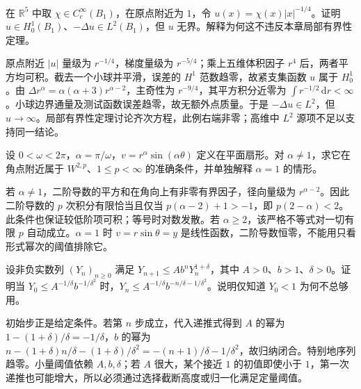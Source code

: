 \begin{exercise}\label{b2:ex:16-l2-unbounded}
在 \(\mathbb R^5\) 中取 \(\chi\in C_c^\infty(B_1)\)，在原点附近为 \(1\)，令 \(u(x)=\chi(x)|x|^{-1/4}\)。证明 \(u\in H_0^1(B_1)\)、\(-\Delta u\in L^2(B_1)\)，但 \(u\) 无界。解释为何这不违反本章局部有界性定理。
\end{exercise}
\begin{solution}
原点附近 \(|u|\) 量级为 \(r^{-1/4}\)，梯度量级为 \(r^{-5/4}\)；乘上五维体积因子 \(r^4\) 后，两者平方均可积。截去一个小球并平滑，误差的 \(H^1\) 范数趋零，故紧支集函数 \(u\) 属于 \(H_0^1\)。由 \(\Delta r^\alpha=\alpha(\alpha+3)r^{\alpha-2}\)，主奇性为 \(r^{-9/4}\)，其平方积分近零为 \(\int r^{-1/2}\,\mathrm dr<\infty\)。小球边界通量及测试函数误差趋零，故无额外点质量。于是 \(-\Delta u\in L^2\)，但 \(u\to\infty\)。局部有界性定理讨论齐次方程，此例右端非零；高维中 \(L^2\) 源项不足以支持同一结论。
\end{solution}

\begin{exercise}\label{b2:ex:16-corner-threshold}
设 \(0<\omega<2\pi\)，\(\alpha=\pi/\omega\)，\(v=r^\alpha\sin(\alpha\theta)\) 定义在平面扇形。对 \(\alpha\ne1\)，求它在角点附近属于 \(W^{2,p}\)、\(1\le p<\infty\) 的准确条件，并单独解释 \(\alpha=1\) 的情形。
\end{exercise}
\begin{solution}
若 \(\alpha\ne1\)，二阶导数的平方和在角向上有非零有界因子，径向量级为 \(r^{\alpha-2}\)。因此二阶导数的 \(p\) 次积分有限恰当且仅当 \(p(\alpha-2)+1>-1\)，即 \(p(2-\alpha)<2\)。此条件也保证较低阶项可积；等号时对数发散。若 \(\alpha\ge2\)，该严格不等式对一切有限 \(p\) 自动成立。\(\alpha=1\) 时 \(v=r\sin\theta=y\) 是线性函数，二阶导数恒零，不能用只看形式幂次的阈值排除它。
\end{solution}

\begin{exercise}\label{b2:ex:16-iteration-lemma}
设非负实数列 \((Y_n)_{n\ge0}\) 满足 \(Y_{n+1}\le Ab^nY_n^{1+\delta}\)，其中 \(A>0\)、\(b>1\)、\(\delta>0\)。证明当 \(Y_0\le A^{-1/\delta}b^{-1/\delta^2}\) 时，\(Y_n\le A^{-1/\delta}b^{-n/\delta-1/\delta^2}\)。说明仅知道 \(Y_0<1\) 为何不总够用。
\end{exercise}
\begin{solution}
初始步正是给定条件。若第 \(n\) 步成立，代入递推式得到 \(A\) 的幂为 \(1-(1+\delta)/\delta=-1/\delta\)，\(b\) 的幂为 \(n-(1+\delta)n/\delta-(1+\delta)/\delta^2=-(n+1)/\delta-1/\delta^2\)，故归纳闭合。特别地序列趋零。小量阈值依赖 \(A,b,\delta\)；若 \(A\) 很大，某个接近 \(1\) 的初值即使小于 \(1\)，第一次递推也可能增大，所以必须通过选择截断高度或归一化满足定量阈值。
\end{solution}

